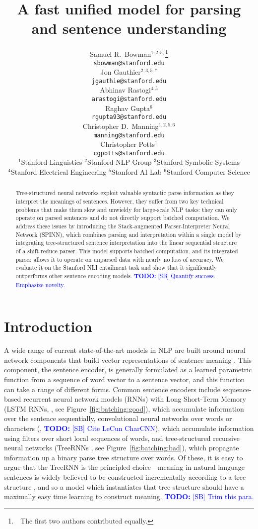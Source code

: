 \documentclass[11pt]{article}
\title{A fast unified model for parsing and sentence understanding}
\author{
    Samuel R.\ Bowman$^{1,2,5,}$\thanks{~\,The first two authors contributed equally.} \\
    \texttt{\small sbowman@stanford.edu} \\
    \And
    Jon Gauthier$^{2,3,5,*}$ \\
    \texttt{\small jgauthie@stanford.edu} \\
    \And
    Abhinav Rastogi$^{4,5}$ \\
    \texttt{\small arastogi@stanford.edu} \\
    \AND
    Raghav Gupta$^{6}$ \\
    \texttt{\small rgupta93@stanford.edu} \\
    \And
    Christopher D.\ Manning$^{1,2,5,6}$\\
    \texttt{\small manning@stanford.edu}\\
    \And
    Christopher Potts$^{1}$\\
    \texttt{\small cgpotts@stanford.edu}
    \AND\\[-3ex]
    {$^{1}$Stanford Linguistics\quad
    $^{2}$Stanford NLP Group\quad
    $^{3}$Stanford Symbolic Systems}\\
    {$^{4}$Stanford Electrical Engineering\quad
    $^{5}$Stanford AI Lab\quad
    $^{6}$Stanford Computer Science}
    }
\date{}
\newcommand\todo[1]{\textcolor{blue}{\textbf{TODO:} #1}}
\begin{document}
\maketitle
\begin{abstract}

Tree-structured neural networks exploit valuable syntactic parse information as they interpret the meanings of sentences. However, they suffer from two key technical problems that make them slow and unwieldy for large-scale NLP tasks: they can only operate on parsed sentences and do not directly support batched computation. We address these issues by introducing the Stack-augmented Parser-Interpreter Neural Network (SPINN), which combines parsing and interpretation within a single model by integrating tree-structured sentence interpretation into the linear sequential structure of a shift-reduce parser. This model  supports batched computation, and its integrated parser allows it to operate on unparsed data with nearly no loss of accuracy. We evaluate it on the Stanford NLI entailment task and show that it significantly outperforms other sentence encoding models. \todo{[SB] Quantify success. Emphasize novelty.}

\end{abstract}

\section{Introduction}




A wide range of current state-of-the-art models in NLP are built around neural network components that build vector representations of sentence meaning \citep{socher2011semi,sutskever2014sequence}. This component, the sentence encoder, is generally formulated as a learned parametric function from a sequence of word vector to a sentence vector, and this function can take a range of different forms. Common sentence encoders include sequence-based recurrent neural network models (RNNs) with Long Short-Term Memory (LSTM RNNs, \citet{hochreiter1997long}, see Figure~\ref{fig:batching:good}), which accumulate information over the sentence sequentially, convolutional neural networks over words or characters (\citet{kalchbrenner2014convolutional}, \todo{[SB] Cite LeCun CharCNN}), which accumulate information using filters over short local sequences of words, and tree-structured recursive neural networks (TreeRNNs \citet{goller1996learning,socher2011semi}, see Figure~\ref{fig:batching:bad}), which propagate information up a binary parse tree structure over words. Of these, it is easy to argue that the TreeRNN is the principled choice---meaning in natural language sentences is widely believed to be constructed incrementally according to a tree structure \citep{Partee84,Janssen97}, and so a model which instantiates that tree structure should have a maximally easy time learning to construct meaning. \todo{[SB] Trim this para.}
\end{document}
